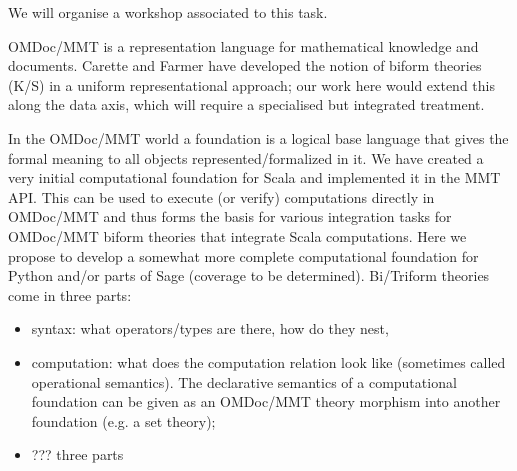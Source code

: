 \begin{workpackage}[id=dksbases,wphases=1-48!.5,
  title=Data/Knowledge/Software-Bases,
  ZHRM=1,JURM=36]
\begin{tasklist}
\begin{task}[title={Design of new infrastructure, formulation of requirements}, id=data_design]
We will organise a workshop associated to this task.
\end{task}

\begin{task}[title=Triform Theories in OMDoc/MMT,id=data_triform]
OMDoc/MMT is a representation language for mathematical knowledge and documents. Carette and Farmer have developed the notion of biform theories (K/S) in a uniform representational approach; our work here would extend this along the data axis, which will require a specialised but integrated treatment.
\end{task}

\begin{task}[title=Computational Foundation for Python/Sage (or some CAS),id=data_foundationCAS]
In the OMDoc/MMT world a foundation is a logical base language that gives the formal meaning to all objects represented/formalized in it. We have created a very initial computational foundation for Scala and implemented it in the MMT API. This can be used to execute (or verify) computations directly in OMDoc/MMT and thus forms the basis for various integration tasks for OMDoc/MMT biform theories that integrate Scala computations. Here we propose to develop a somewhat more complete computational foundation for Python and/or parts of Sage (coverage to be determined). Bi/Triform theories come in three parts:
\begin{itemize}
\item syntax: what operators/types are there, how do they nest, 
\item computation:  what does the computation relation look like (sometimes called operational semantics). The declarative semantics of a computational foundation can be given as an OMDoc/MMT theory morphism into another foundation (e.g. a set theory);
\item ??? three parts
\end{itemize}
\end{task}


\end{tasklist}
\end{workpackage}
